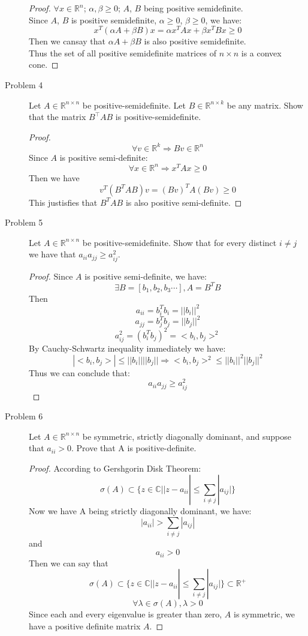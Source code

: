 \documentclass{article}
\begin{document}
\begin{description}
	\begin{proof}
		$\forall x \in \mathbb{R}^n$; $\alpha,\beta \geq 0$; $A$, $B$ being positive semidefinite.\\
		Since $A$, $B$ is positive semidefinite, $\alpha \geq 0$, $\beta \geq 0$, we have:
		$$ x^T(\alpha A + \beta B)x = \alpha x^TAx + \beta x^TBx \geq 0$$
		Then we cansay that $\alpha A + \beta B$ is also positive semidefinite. \\
		Thus the set of all positive semidefinite matrices of $n \times n$ is a convex cone.
	\end{proof}


	\item[Problem 4] Let $A \in \mathbb{R}^{n\times n}$  be positive-semidefinite. Let $B \in \mathbb{R}^{n \times k}$ be any matrix. Show that the matrix $B^\top A B$ is positive-semidefinite.
	\begin{proof}
		$$\forall v \in \mathbb{R}^k \Rightarrow Bv \in \mathbb{R}^n$$
		Since $A$ is positive semi-definite: 
		$$\forall x \in \mathbb{R}^n \Rightarrow x^TAx \geq 0$$ 
		Then we have
		$$v^T(B^TAB)v = (Bv)^TA(Bv) \geq 0$$
		This justisfies that $B^TAB$ is also positive semi-definite.
	\end{proof}

	\item[Problem 5] Let $A \in \mathbb{R}^{n\times n}$  be positive-semidefinite. Show that for every distinct $i\neq j$ we have that $a_{ii} a_{jj} \ge a_{ij}^2$.
	\begin{proof}
		Since $A$ is positive semi-definite, we have:
		$$ \exists B=[b_1, b_2, b_3 \cdots], A = B^TB $$
		Then 
		$$a_{ii}=b_i^Tb_i = ||b_i||^2$$
		$$a_{jj}=b_j^Tb_j = ||b_j||^2$$
		$$a_{ij}^2=(b_i^Tb_j)^2 = <b_i, b_j>^2$$
		By Cauchy-Schwartz inequality immediately we have:
		$$|<b_i, b_j>| \leq ||b_i||||b_j|| \Rightarrow <b_i, b_j>^2 \leq ||b_i||^2||b_j||^2$$
		Thus we can conclude that:
		$$ a_{ii}a_{jj} \geq a_{ij}^2 $$
	\end{proof}

	\item[Problem 6] Let $A \in \mathbb{R}^{n\times n}$  be symmetric, strictly diagonally dominant, and suppose that $a_{ii} >0$. Prove that A is positive-definite.
	\begin{proof}
		According to Gershgorin Disk Theorem:
		$$\sigma(A) \subset \{z \in \mathbb{C} | |z - a_{ii}| \leq \sum_{i\neq j} |a_{ij}|\}$$
		Now we have A being strictly diagonally dominant, we have:
		$$ |a_{ii}| > \sum_{i\neq j} |a_{ij}|$$
		and $$a_{ii} > 0$$
		Then we can say that 
		$$\sigma(A) \subset \{z \in \mathbb{C} | |z - a_{ii}| \leq \sum_{i\neq j} |a_{ij}|\} \subset \mathbb{R}^+$$
		$$ \forall \lambda \in \sigma(A), \lambda > 0$$
		Since each and every eigenvalue is greater than zero, $A$ is symmetric, we have a positive definite matrix $A$.

	\end{proof}

\end{description}
\end{document}
